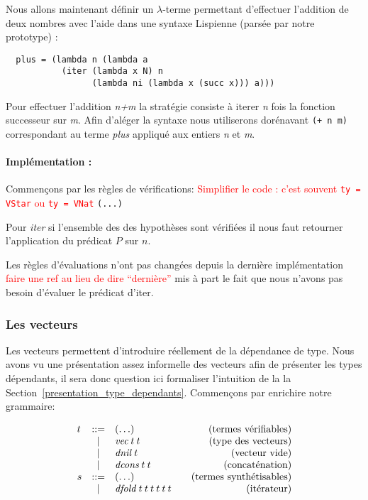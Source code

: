\documentclass {article}
\makeatletter
\newcommand{\codefrom}[3]
           {}
\theoremstyle{definition}
\theoremstyle{remark}
\newcommand{\todo}[1]{\textcolor{red}{#1}}
\newenvironment{bnf}
               {\[\begin{array}{lcl@{\qquad}r}}
               {\end{array}\]}
\makeatother
\begin{document}
Nous allons maintenant définir un $\lambda$-terme permettant d'effectuer l'addition de deux nombres avec l'aide dans une syntaxe
Lispienne (parsée par notre prototype) :
\begin{lstlisting}
  plus = (lambda n (lambda a 
           (iter (lambda x N) n 
                 (lambda ni (lambda x (succ x))) a)))
\end{lstlisting}
Pour effectuer l'addition \emph{n\:+\:m} la stratégie consiste à iterer \emph{n} fois la fonction successeur sur \emph{m}.
Afin d'aléger la syntaxe nous utiliserons dorénavant \lstinline!(+ n m)! correspondant au terme \emph{plus} appliqué aux entiers \emph{n} et
\emph{m}.

\paragraph{Implémentation :} 

Commençons par les règles de vérifications: \todo{Simplifier le code : c'est souvent \lstinline!ty = VStar! ou  \lstinline!ty = VNat!}
\codefrom{dependent}{lambda}{check_head}\lstinline!(...)!
\codefrom{dependent}{lambda}{check_nat}

Pour \emph{iter} si l'ensemble des des hypothèses sont vérifiées il nous faut retourner l'application
du prédicat $P$ sur $n$.
\codefrom{dependent}{lambda}{synth_iter}


Les règles d'évaluations n'ont pas changées depuis la dernière implémentation \todo{faire une ref au lieu de dire ``dernière''} mis à part le fait que  
nous n'avons pas besoin d'évaluer le prédicat d'iter.


\subsubsection{Les vecteurs}

Les vecteurs permettent d'introduire réellement de la dépendance de type. Nous avons vu une 
présentation assez informelle
des vecteurs afin de présenter les types dépendants, il sera donc question ici formaliser l'intuition de la
la Section~\ref{presentation_type_dependants}. 
Commençons par enrichire notre grammaire:

\newcommand{\vect}{\mathit{vec}} 
\newcommand{\dnil}{\mathit{dnil}}
\newcommand{\dcons}{\mathit{dcons}}
\newcommand{\dfold}{\mathit{dfold}}

\begin{bnf}
  t &::= & (\ldots) &\mbox{(termes vérifiables)} \\
  &|& \vect\:t\:t & \mbox{(type des vecteurs)} \\
  &|& \dnil\:t & \mbox{(vecteur vide)} \\
  &|& \dcons\:t\:t & \mbox{(concaténation)} \\
  s &::= & (\ldots) &\mbox{(termes synthétisables)} \\
  &|& \dfold\:t\:t\:t\:t\:t\:t & \mbox{(itérateur)}
\end{bnf}
\end{document}
